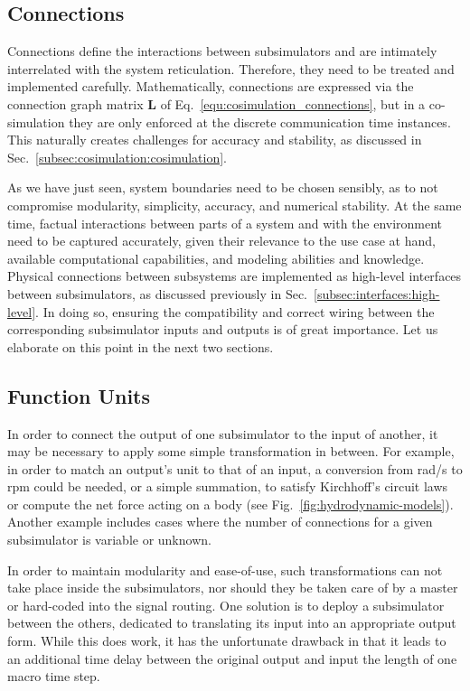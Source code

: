 \documentclass[prb,aps,showpacs,floatfix,twocolumn,10pt]{revtex4-1}
\newcommand{\vect}[1]{\bm{#1}}
\newcommand{\sub}{subsimulator}
\theoremstyle{plain}
\theoremstyle{remark}
\begin{document}
\subsection{Connections}
\label{subsec:construction:connections}

Connections define the interactions between \sub{}s and are intimately interrelated with the system reticulation.
Therefore, they need to be treated and implemented carefully.
Mathematically, connections are expressed via the connection graph matrix $\vect{L}$ of Eq.~\eqref{equ:cosimulation_connections}, but in a co-simulation they are only enforced at the discrete communication time instances.
This naturally creates challenges for accuracy and stability, as discussed in Sec.~\ref{subsec:cosimulation:cosimulation}.

As we have just seen, system boundaries need to be chosen sensibly, as to not compromise modularity, simplicity, accuracy, and numerical stability.
At the same time, factual interactions between parts of a system and with the environment need to be captured accurately, given their relevance to the use case at hand, available computational capabilities, and modeling abilities and knowledge.
Physical connections between subsystems are implemented as high-level interfaces between \sub{}s, as discussed previously in Sec.~\ref{subsec:interfaces:high-level}.
In doing so, ensuring the compatibility and correct wiring between the corresponding \sub{} inputs and outputs is of great importance.
Let us elaborate on this point in the next two sections.


\subsection{Function Units}
\label{subsec:construction:function_units}

In order to connect the output of one \sub{} to the input of another, it may be necessary to apply some simple transformation in between.
For example, in order to match an output's unit to that of an input, a conversion from \si{\radian/\second} to \si{rpm} could be needed, or a simple summation, to satisfy Kirchhoff's circuit laws or compute the net force acting on a body (see Fig.~\ref{fig:hydrodynamic-models}).
Another example includes cases where the number of connections for a given \sub{} is variable or unknown.

In order to maintain modularity and ease-of-use, such transformations can not take place inside the \sub{}s, nor should they be taken care of by a master or hard-coded into the signal routing.
One solution is to deploy a \sub{} between the others, dedicated to translating its input into an appropriate output form.
While this does work, it has the unfortunate drawback in that it leads to an additional time delay between the original output and input the length of one macro time step.
\end{document}
